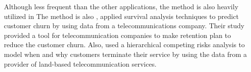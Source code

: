 \documentclass[12pt,letterpaper]{article}
\begin{document}
Although less frequent than the other applications, the method is also heavily utilized in The method is also , \citet{lu2002} applied survival analysis techniques to predict customer churn by using data from a telecommunications company. Their study provided a tool for telecommunication companies to make retention plan to reduce the customer churn.
Also, \citet{braun2011} used a hierarchical competing risks analysis to model when and why customers terminate their service by using the data from a provider of land-based telecommunication services. %
\end{document}
